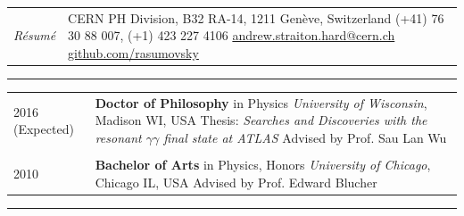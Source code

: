 \documentclass{letter}
\begin{document}
 


\begin{tabular}{p{}p{}}
	\hfill \newline \href{https://ch.linkedin.com/in/andrew-hard-25b690a5}{\Huge{\color{Maroon}{Andrew Hard}}} \newline \LARGE{\textit{R\'{e}sum\'{e}}} \newline
	&
	\hfill \newline CERN PH Division, B32 RA-14, 1211 Gen\`{e}ve, Switzerland \newline
	(+41) 76 30 88 007, (+1) 423 227 4106 \newline
	\href{mailto:ahard@cern.ch}{andrew.straiton.hard@cern.ch} \newline
	\href{https://github.com/rasumovsky}{github.com/rasumovsky}\\
\end{tabular}

\begin{flushleft}
\Large{\textsc{\textbf{\color{Maroon}{Education}}}}
\vspace{1pt} %
\hrule
\end{flushleft}

\begin{tabular}{p{}p{}}
	2016 (Expected)
	&
	\textbf{Doctor of Philosophy} in Physics \newline 
	\textit{University of Wisconsin}, Madison WI, USA \newline
	Thesis: \textit{Searches and Discoveries with the resonant $\gamma\gamma$ final state at ATLAS} \newline
	Advised by Prof. Sau Lan Wu \\
\\
	2010 
	& 
	\textbf{Bachelor of Arts} in Physics, Honors \newline 
	\textit{University of Chicago}, Chicago IL, USA \newline
	Advised by Prof. Edward Blucher 
\\
\end{tabular}

\begin{flushleft}
\Large{\textsc{\textbf{\color{Maroon}{Experience}}}}
\vspace{1pt} %
\hrule
\end{flushleft}
\end{document}
